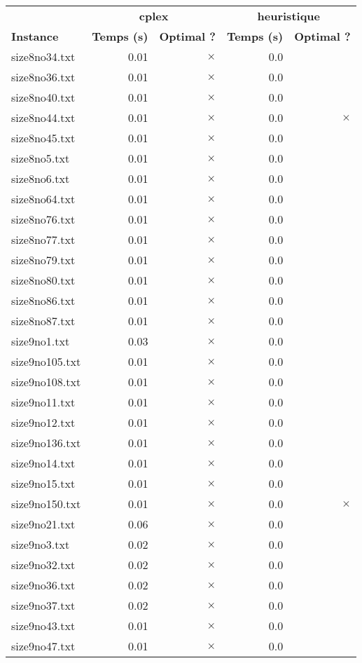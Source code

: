 \documentclass{article}
\begin{document}
\newpage
\begin{center}
\renewcommand{\arraystretch}{1.4} 
 \begin{tabular}{lrrrr}
	\hline
 & \multicolumn{2}{c}{\textbf{cplex}} & \multicolumn{2}{c}{\textbf{heuristique}}\\
\textbf{Instance}  & \textbf{Temps (s)} & \textbf{Optimal ?}  & \textbf{Temps (s)} & \textbf{Optimal ?} \\\hline

size8no34.txt & 0.01 & 
$\times$
 & 0.0 & 
\\
size8no36.txt & 0.01 & 
$\times$
 & 0.0 & 
\\
size8no40.txt & 0.01 & 
$\times$
 & 0.0 & 
\\
size8no44.txt & 0.01 & 
$\times$
 & 0.0 & 
$\times$
\\
size8no45.txt & 0.01 & 
$\times$
 & 0.0 & 
\\
size8no5.txt & 0.01 & 
$\times$
 & 0.0 & 
\\
size8no6.txt & 0.01 & 
$\times$
 & 0.0 & 
\\
size8no64.txt & 0.01 & 
$\times$
 & 0.0 & 
\\
size8no76.txt & 0.01 & 
$\times$
 & 0.0 & 
\\
size8no77.txt & 0.01 & 
$\times$
 & 0.0 & 
\\
size8no79.txt & 0.01 & 
$\times$
 & 0.0 & 
\\
size8no80.txt & 0.01 & 
$\times$
 & 0.0 & 
\\
size8no86.txt & 0.01 & 
$\times$
 & 0.0 & 
\\
size8no87.txt & 0.01 & 
$\times$
 & 0.0 & 
\\
size9no1.txt & 0.03 & 
$\times$
 & 0.0 & 
\\
size9no105.txt & 0.01 & 
$\times$
 & 0.0 & 
\\
size9no108.txt & 0.01 & 
$\times$
 & 0.0 & 
\\
size9no11.txt & 0.01 & 
$\times$
 & 0.0 & 
\\
size9no12.txt & 0.01 & 
$\times$
 & 0.0 & 
\\
size9no136.txt & 0.01 & 
$\times$
 & 0.0 & 
\\
size9no14.txt & 0.01 & 
$\times$
 & 0.0 & 
\\
size9no15.txt & 0.01 & 
$\times$
 & 0.0 & 
\\
size9no150.txt & 0.01 & 
$\times$
 & 0.0 & 
$\times$
\\
size9no21.txt & 0.06 & 
$\times$
 & 0.0 & 
\\
size9no3.txt & 0.02 & 
$\times$
 & 0.0 & 
\\
size9no32.txt & 0.02 & 
$\times$
 & 0.0 & 
\\
size9no36.txt & 0.02 & 
$\times$
 & 0.0 & 
\\
size9no37.txt & 0.02 & 
$\times$
 & 0.0 & 
\\
size9no43.txt & 0.01 & 
$\times$
 & 0.0 & 
\\
size9no47.txt & 0.01 & 
$\times$
 & 0.0 & 
\\
\hline\end{tabular}
\end{center}
\end{document}
